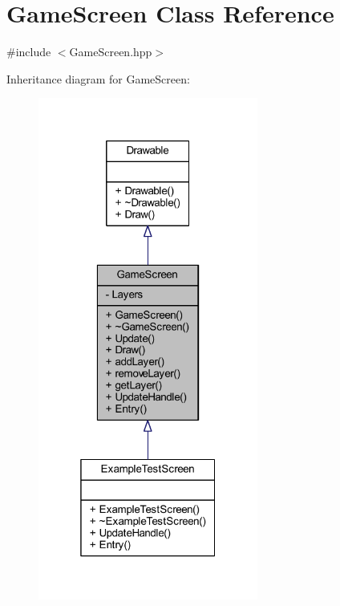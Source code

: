 \hypertarget{class_game_screen}{\section{Game\-Screen Class Reference}
\label{class_game_screen}
}


{\ttfamily \#include $<$Game\-Screen.\-hpp$>$}



Inheritance diagram for Game\-Screen\-:\nopagebreak
\begin{figure}[H]
\begin{center}
\leavevmode
\includegraphics[width=205pt]{class_game_screen__inherit__graph}
\end{center}
\end{figure}


